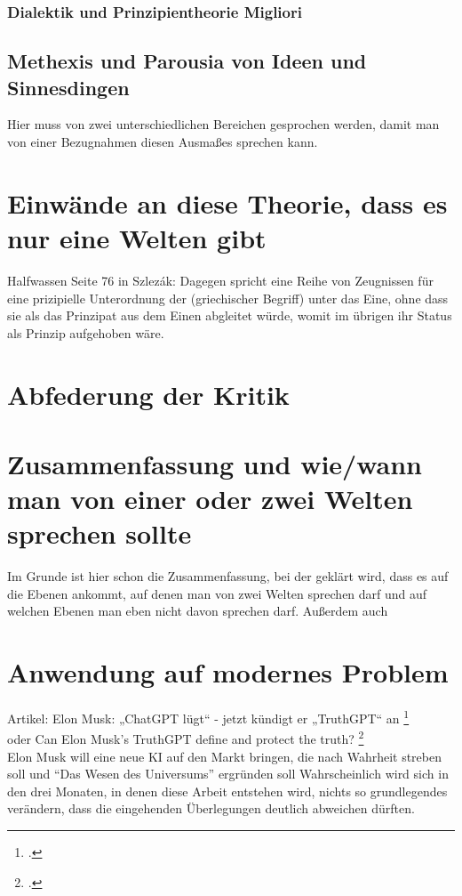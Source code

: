 \documentclass[12pt]{article}
\begin{document}
\subsubsection*{Dialektik und Prinzipientheorie Migliori}

\subsection{Methexis und Parousia von Ideen und Sinnesdingen}
Hier muss von zwei unterschiedlichen Bereichen gesprochen werden, damit man von einer Bezugnahmen diesen Ausmaßes sprechen kann. 
\section{Einwände an diese Theorie, dass es nur eine Welten gibt}
Halfwassen Seite 76 in Szlezák: Dagegen spricht eine Reihe von Zeugnissen für eine prizipielle Unterordnung der (griechischer Begriff) unter das Eine, ohne dass sie als das Prinzipat aus dem Einen abgleitet würde, womit im übrigen ihr Status als Prinzip aufgehoben wäre.
\section{Abfederung der Kritik}
\section{Zusammenfassung und wie/wann man von einer oder zwei Welten sprechen sollte}
Im Grunde ist hier schon die Zusammenfassung, bei der geklärt wird, dass es auf die Ebenen ankommt, auf denen man von zwei Welten sprechen darf und auf welchen Ebenen man eben nicht davon sprechen darf. Außerdem auch 

\section{Anwendung auf modernes Problem}
Artikel: Elon Musk: „ChatGPT lügt“ - jetzt kündigt er „TruthGPT“ an \footcite[][]{MuskTruthGPTFokus}\\
oder Can Elon Musk’s TruthGPT define and protect the truth? \footcite[][]{MuskTruthGPTReuters}\\
Elon Musk will eine neue KI auf den Markt bringen, die nach Wahrheit streben soll und \enquote{Das Wesen des Universums} ergründen soll
Wahrscheinlich wird sich in den drei Monaten, in denen diese Arbeit entstehen wird, nichts so grundlegendes verändern, dass die eingehenden Überlegungen deutlich abweichen dürften. 
\end{document}
